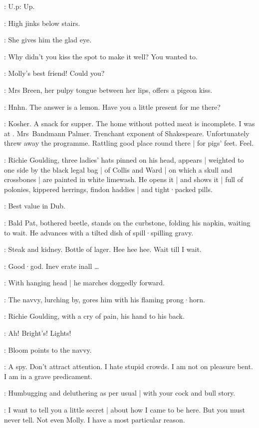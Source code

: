 \AlfBergan:
U.p:
Up.

\MrsBreen:
High jinks below stairs.

:
She gives him the glad eye.

\MrsBreen:
Why didn't you kiss the spot to make it well?
You wanted to.

\Bloom:
Molly's best friend!
Could you?

:
Mrs Breen,
her pulpy tongue between her lips,
offers a pigeon kiss.

\MrsBreen:
Hnhn.
The answer is a lemon.
Have you a little present for me there?

\Bloom:
Kosher.
A snack for supper.
The home without potted meat is incomplete.
I was at .
Mrs~Bandmann Palmer.
Trenchant exponent of Shakespeare.
Unfortunately threw away the programme.
Rattling good place round there |
for pigs' feet.
Feel.

:
Richie Goulding,
three ladies' hats pinned on his head,
appears |
weighted to one side by the black legal bag |
of 
Collis and Ward |
on which a skull and crossbones |
are painted in white limewash.
He opens it |
and shows it |
full of polonies,
kippered herrings,
findon haddies |
and tight·packed pills.

\Richie:
Best value in Dub.

:
Bald Pat,
bothered beetle,
stands on the curbstone,
folding his napkin,
waiting to wait.
He advances with a tilted dish of spill·spilling gravy.

\Pat:
Steak and kidney.
Bottle of lager.
Hee hee hee.
Wait till I wait.

\Richie[2]:
Good·god.
Inev erate inall \ldots

:
With hanging head |
he marches doggedly forward.

:
The navvy,
lurching by,
gores him with his flaming prong·horn.

:
Richie Goulding,
with a cry of pain,
his hand to his back.

\Richie:
Ah!
Bright's!
Lights!

:
Bloom points to the navvy.

\Bloom:
A spy.
Don't attract attention.
I hate stupid crowds.
I am not on pleasure bent.
I am in a grave predicament.

\MrsBreen:
Humbugging and deluthering as per usual |
with your cock and bull story.

\Bloom:
I want to tell you a little secret |
about how I came to be here.
But you must never tell.
Not even Molly.
I have a most particular reason.

